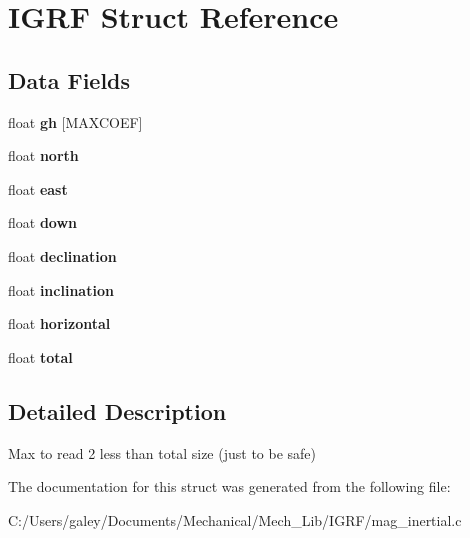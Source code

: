 \hypertarget{struct_i_g_r_f}{}\section{I\+G\+RF Struct Reference}
\label{struct_i_g_r_f}
\subsection*{Data Fields}
\begin{DoxyCompactItemize}
\item 
\mbox{\label{struct_i_g_r_f_a961b6db7f7fedb1ddd3a1df8782ab7c2}} 
float {\bfseries gh} \mbox{[}M\+A\+X\+C\+O\+EF\mbox{]}
\item 
\mbox{\label{struct_i_g_r_f_a0d1a68e1994a98e1580f28cbc9989c99}} 
float {\bfseries north}
\item 
\mbox{\label{struct_i_g_r_f_a6bfd19622a0669e50f8b27d153eb0dd1}} 
float {\bfseries east}
\item 
\mbox{\label{struct_i_g_r_f_adf90cacd620a17e7a7a4a335a6fb9d5b}} 
float {\bfseries down}
\item 
\mbox{\label{struct_i_g_r_f_a87088520682791495522a2e20bf06860}} 
float {\bfseries declination}
\item 
\mbox{\label{struct_i_g_r_f_adb044888f4fd1728d7e1386884324e4d}} 
float {\bfseries inclination}
\item 
\mbox{\label{struct_i_g_r_f_a2346d053d917ae4a61e1b5acd0dded0d}} 
float {\bfseries horizontal}
\item 
\mbox{\label{struct_i_g_r_f_a10a770f02ba0757d779ece8e2ee384f5}} 
float {\bfseries total}
\end{DoxyCompactItemize}


\subsection{Detailed Description}
Max to read 2 less than total size (just to be safe) 

The documentation for this struct was generated from the following file\+:\begin{DoxyCompactItemize}
\item 
C\+:/\+Users/galey/\+Documents/\+Mechanical/\+Mech\+\_\+\+Lib/\+I\+G\+R\+F/mag\+\_\+inertial.\+c\end{DoxyCompactItemize}
